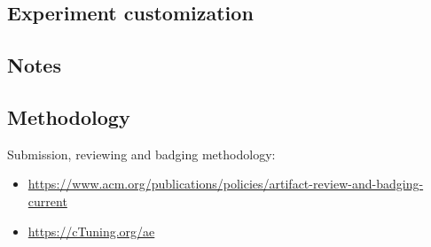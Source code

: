 \documentclass{sigplanconf}
\begin{document}
\subsection{Experiment customization}

\subsection{Notes}

\subsection{Methodology}

Submission, reviewing and badging methodology:

\begin{itemize}
  \item \url{https://www.acm.org/publications/policies/artifact-review-and-badging-current}
  \item \url{https://cTuning.org/ae}
\end{itemize}

\end{document}
